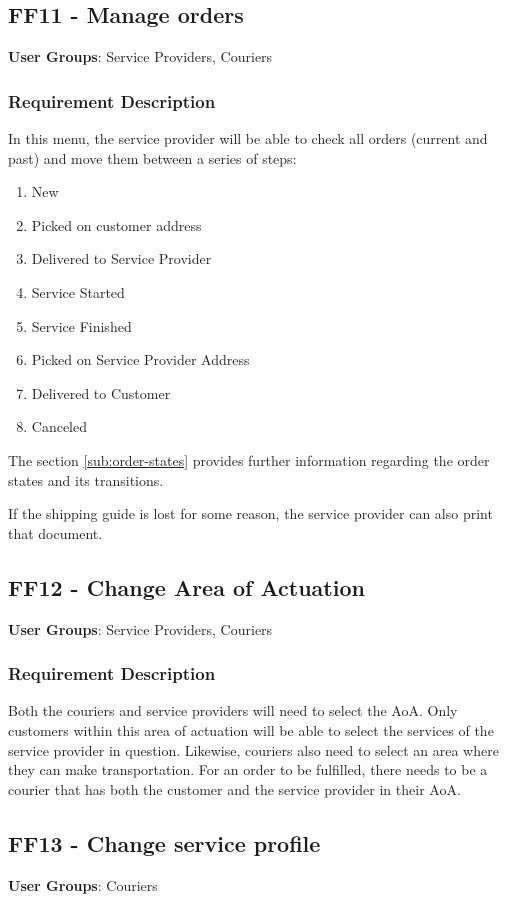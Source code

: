\subsection{FF11 - Manage orders}
\textbf{User Groups}: Service Providers, Couriers

\subsubsection{Requirement Description}
In this menu, the service provider will be able to check all orders (current and past) and move them between a series of steps:
\begin{enumerate}
    \item New
    \item Picked on customer address
    \item Delivered to Service Provider
    \item Service Started
    \item Service Finished
    \item Picked on Service Provider Address
    \item Delivered to Customer
    \item Canceled
\end{enumerate}

The section \ref{sub:order-states} provides further information regarding the order states and its transitions.
\par
If the shipping guide is lost for some reason, the service provider can also print that document.

\clearpage
\subsection{FF12 - Change Area of Actuation}
\textbf{User Groups}: Service Providers, Couriers

\subsubsection{Requirement Description}
Both the couriers and service providers will need to select the \gls{AoA}. Only customers within this area of actuation will be able to select the services of the service provider in question. Likewise, couriers also need to select an area where they can make transportation. For an order to be fulfilled, there needs to be a courier that has both the customer and the service provider in their \gls{AoA}.

\subsection{FF13 - Change service profile}
\textbf{User Groups}: Couriers


